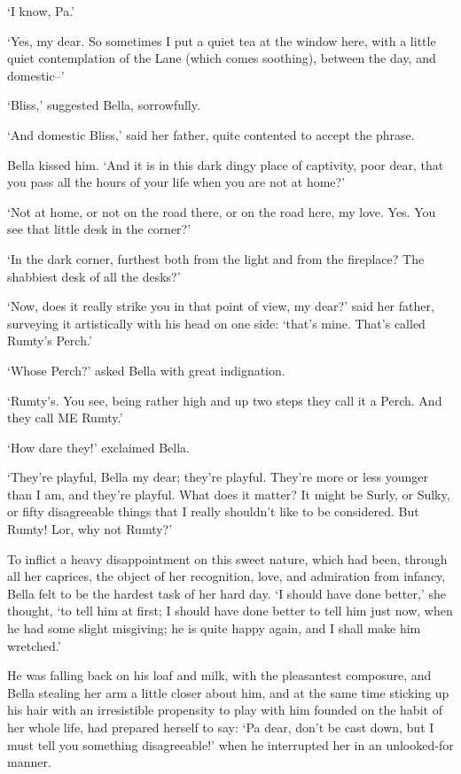 ‘I know, Pa.’

‘Yes, my dear. So sometimes I put a quiet tea at the window here, with
a little quiet contemplation of the Lane (which comes soothing), between
the day, and domestic--’

‘Bliss,’ suggested Bella, sorrowfully.

‘And domestic Bliss,’ said her father, quite contented to accept the
phrase.

Bella kissed him. ‘And it is in this dark dingy place of captivity,
poor dear, that you pass all the hours of your life when you are not at
home?’

‘Not at home, or not on the road there, or on the road here, my love.
Yes. You see that little desk in the corner?’

‘In the dark corner, furthest both from the light and from the
fireplace? The shabbiest desk of all the desks?’

‘Now, does it really strike you in that point of view, my dear?’ said
her father, surveying it artistically with his head on one side: ‘that’s
mine. That’s called Rumty’s Perch.’

‘Whose Perch?’ asked Bella with great indignation.

‘Rumty’s. You see, being rather high and up two steps they call it a
Perch. And they call ME Rumty.’

‘How dare they!’ exclaimed Bella.

‘They’re playful, Bella my dear; they’re playful. They’re more or less
younger than I am, and they’re playful. What does it matter? It might
be Surly, or Sulky, or fifty disagreeable things that I really shouldn’t
like to be considered. But Rumty! Lor, why not Rumty?’

To inflict a heavy disappointment on this sweet nature, which had been,
through all her caprices, the object of her recognition, love, and
admiration from infancy, Bella felt to be the hardest task of her hard
day. ‘I should have done better,’ she thought, ‘to tell him at first;
I should have done better to tell him just now, when he had some slight
misgiving; he is quite happy again, and I shall make him wretched.’

He was falling back on his loaf and milk, with the pleasantest
composure, and Bella stealing her arm a little closer about him, and at
the same time sticking up his hair with an irresistible propensity
to play with him founded on the habit of her whole life, had prepared
herself to say: ‘Pa dear, don’t be cast down, but I must tell you
something disagreeable!’ when he interrupted her in an unlooked-for
manner.

